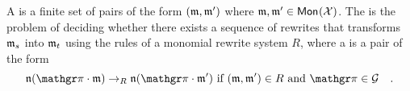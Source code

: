 \begin{definition}
  \label{def:mon-rewrite-system}
  A  is a finite set of pairs of the form
  $(\monelt, \monelt')$ where $\monelt, \monelt' \in \mon{\Indets}$.
  The  is the problem of deciding whether
  there exists a sequence of rewrites that transforms $\monelt_s$ into $\monelt_t$
  using the rules of a monomial rewrite system $R$, where
  a  is a pair of the form
  \begin{equation*}
    \monelt[n] (\gelem \cdot \monelt)
    \to_R 
    \monelt[n] (\gelem \cdot \monelt')
    \text{ if } (\monelt, \monelt') \in R
    \text{ and } \gelem \in \group
    \quad .
  \end{equation*}
\end{definition}


